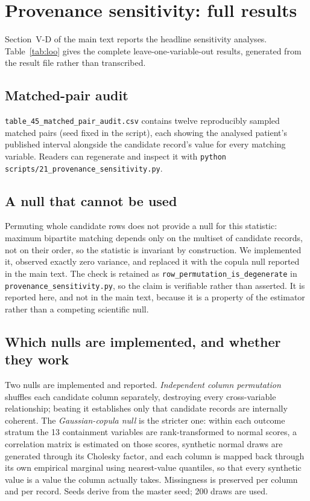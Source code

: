 \documentclass[conference]{IEEEtran}
\begin{document}
\section{Provenance sensitivity: full results}

Section~V-D of the main text reports the headline sensitivity analyses.
Table~\ref{tab:loo} gives the complete leave-one-variable-out results,
generated from the result file rather than transcribed.



\subsection{Matched-pair audit}

\texttt{table\_45\_matched\_pair\_audit.csv} contains twelve reproducibly
sampled matched pairs (seed fixed in the script), each showing the analysed
patient's published interval alongside the candidate record's value for every
matching variable. Readers can regenerate and inspect it with
\texttt{python scripts/21\_provenance\_sensitivity.py}.

\subsection{A null that cannot be used}

Permuting whole candidate rows does not provide a null for this statistic:
maximum bipartite matching depends only on the multiset of candidate records,
not on their order, so the statistic is invariant by construction. We
implemented it, observed exactly zero variance, and replaced it with the
copula null reported in the main text. The check is retained as
\texttt{row\_permutation\_is\_degenerate} in
\texttt{provenance\_sensitivity.py}, so the claim is verifiable rather than
asserted. It is reported here, and not in the main text, because it is a
property of the estimator rather than a competing scientific null.

\subsection{Which nulls are implemented, and whether they work}

Two nulls are implemented and reported. \emph{Independent column permutation}
shuffles each candidate column separately, destroying every cross-variable
relationship; beating it establishes only that candidate records are
internally coherent. The \emph{Gaussian-copula null} is the stricter one:
within each outcome stratum the 13 containment variables are rank-transformed
to normal scores, a correlation matrix is estimated on those scores, synthetic
normal draws are generated through its Cholesky factor, and each column is
mapped back through its own empirical marginal using nearest-value
quantiles, so that every synthetic value is a value the column actually
takes. Missingness is preserved per column and per record. Seeds derive from
the master seed; 200 draws are used.
\end{document}

